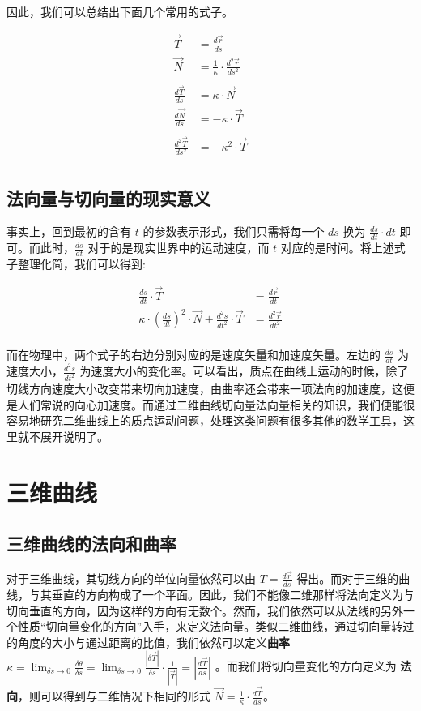 \documentclass[fontset=windows]{article}
\begin{document}
因此，我们可以总结出下面几个常用的式子。

$$
\begin{aligned}
\vec{T} &= \frac{d\vec{r}}{ds} \\
\vec{N} &= \frac{1}{\kappa} \cdot \frac{d^2\vec{r}}{ds^2} \\
\\
\frac{d\vec{T}}{ds} &= {\kappa} \cdot {\vec{N}} \\
\frac{d\vec{N}}{ds} &= -{\kappa} \cdot {\vec{T}} \\
\\
\frac{d^2\vec{T}}{ds^2} &= - \kappa ^ 2 \cdot \vec{T} \\
\end{aligned}
$$

\subsection{法向量与切向量的现实意义}

事实上，回到最初的含有 $t$ 的参数表示形式，我们只需将每一个 $ds$ 换为 $\frac{ds}{dt} \cdot dt$ 即可。而此时，$\frac{ds}{dt}$ 对于的是现实世界中的运动速度，而 $t$ 对应的是时间。将上述式子整理化简，我们可以得到:

$$
\begin{aligned}
\frac{ds}{dt}\cdot\vec{T} &= \frac{d\vec{r}}{dt} \\
\kappa \cdot (\frac{ds}{dt}) ^ 2 \cdot \vec{N} + \frac{d^2s}{dt^2}\cdot\vec{T} &= \frac{d^2\vec{r}}{dt^2}  \\
\end{aligned}
$$

而在物理中，两个式子的右边分别对应的是速度矢量和加速度矢量。左边的 $\frac{ds}{dt}$ 为速度大小，$\frac{d^2s}{dt^2}$ 为速度大小的变化率。可以看出，质点在曲线上运动的时候，除了切线方向速度大小改变带来切向加速度，由曲率还会带来一项法向的加速度，这便是人们常说的向心加速度。而通过二维曲线切向量法向量相关的知识，我们便能很容易地研究二维曲线上的质点运动问题，处理这类问题有很多其他的数学工具，这里就不展开说明了。

\section{三维曲线}

\subsection{三维曲线的法向和曲率}

对于三维曲线，其切线方向的单位向量依然可以由 $T = \frac{d\vec{r}}{ds}$ 得出。而对于三维的曲线，与其垂直的方向构成了一个平面。因此，我们不能像二维那样将法向定义为与切向垂直的方向，因为这样的方向有无数个。然而，我们依然可以从法线的另外一个性质“切向量变化的方向”入手，来定义法向量。类似二维曲线，通过切向量转过的角度的大小与通过距离的比值，我们依然可以定义\textbf{曲率} $\kappa = \lim_{\delta s \rightarrow 0}{\frac{δθ}{δs}} = \lim_{\delta s \rightarrow 0}{\frac{|\delta {\vec{T}}|}{\delta s}}\cdot{\frac1{|\vec{T}|}} = |\frac{d\vec T}{ds}|$ 。而我们将切向量变化的方向定义为 \textbf{法向}，则可以得到与二维情况下相同的形式 $\vec{N} = \frac1{\kappa}\cdot\frac{d\vec{T}}{ds}$。
\end{document}
